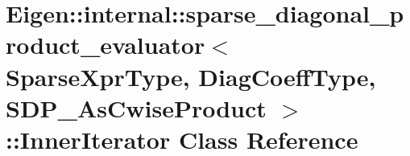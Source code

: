 \hypertarget{class_eigen_1_1internal_1_1sparse__diagonal__product__evaluator_3_01_sparse_xpr_type_00_01_diag_f44167c623880e382ac76ec71f78299c}{}\section{Eigen\+::internal\+::sparse\+\_\+diagonal\+\_\+product\+\_\+evaluator$<$ Sparse\+Xpr\+Type, Diag\+Coeff\+Type, S\+D\+P\+\_\+\+As\+Cwise\+Product $>$\+::Inner\+Iterator Class Reference}
\label{class_eigen_1_1internal_1_1sparse__diagonal__product__evaluator_3_01_sparse_xpr_type_00_01_diag_f44167c623880e382ac76ec71f78299c}
